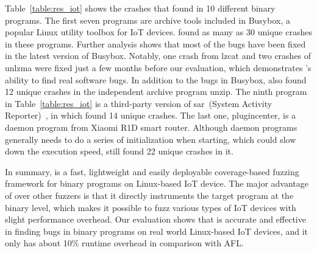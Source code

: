 Table~\ref{table:res_iot} shows the crashes that \sysname found in 10 different binary programs. The first seven programs are archive tools included in Busybox, a popular Linux utility toolbox for IoT devices. \sysname found as many as 30 unique crashes in these programs. Further analysis shows that most of the bugs have been fixed in the latest version of Busybox. Notably, one crash from lzcat and two crashes of unlzma were fixed just a few months before our evaluation, which demonstrates \sysname's ability to find real software bugs. In addition to the bugs in Busybox, \sysname also found 12 unique crashes in the independent archive program unzip. The ninth program in Table~\ref{table:res_iot} is a third-party version of sar~(System Activity Reporter)~\cite{sar}, in which \sysname found 14 unique crashes. The last one, plugincenter, is a daemon program from Xiaomi R1D smart router. Although daemon programs generally needs to do a series of initialization when starting, which could slow down the execution speed, \sysname still found 22 unique crashes in it.

In summary, \sysname is a fast, lightweight and easily deployable coverage-based fuzzing framework for binary programs on Linux-based IoT device. The major advantage of \sysname over other fuzzers is that it directly instruments the target program at the binary level, which makes it possible to fuzz various types of IoT devices with slight performance overhead. Our evaluation shows that \sysname is accurate and effective in finding bugs in binary programs on real world Linux-based IoT devices, and it only has about 10\% runtime overhead in comparison with AFL.